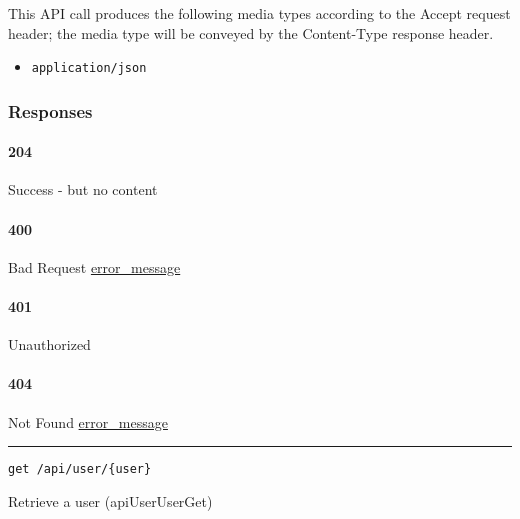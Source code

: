 This API call produces the following media types according to the
{Accept} request header; the media type will be conveyed by the
{Content-Type} response header.

\begin{itemize}
\tightlist
\item
  \texttt{application/json}
\end{itemize}

\hypertarget{responses-9}{%
\subsubsection{Responses}\label{responses-9}}

\hypertarget{section-28}{%
\paragraph{204}\label{section-28}}

Success - but no content \protect\hyperlink{}{}

\hypertarget{section-29}{%
\paragraph{400}\label{section-29}}

Bad Request \protect\hyperlink{error_message}{error\_message}

\hypertarget{section-30}{%
\paragraph{401}\label{section-30}}

Unauthorized \protect\hyperlink{}{}

\hypertarget{section-31}{%
\paragraph{404}\label{section-31}}

Not Found \protect\hyperlink{error_message}{error\_message}

\begin{center}\rule{0.5\linewidth}{\linethickness}\end{center}

\protect\hypertarget{apiUserUserGet}{}{}

\begin{verbatim}
get /api/user/{user}
\end{verbatim}

Retrieve a user ({apiUserUserGet})

